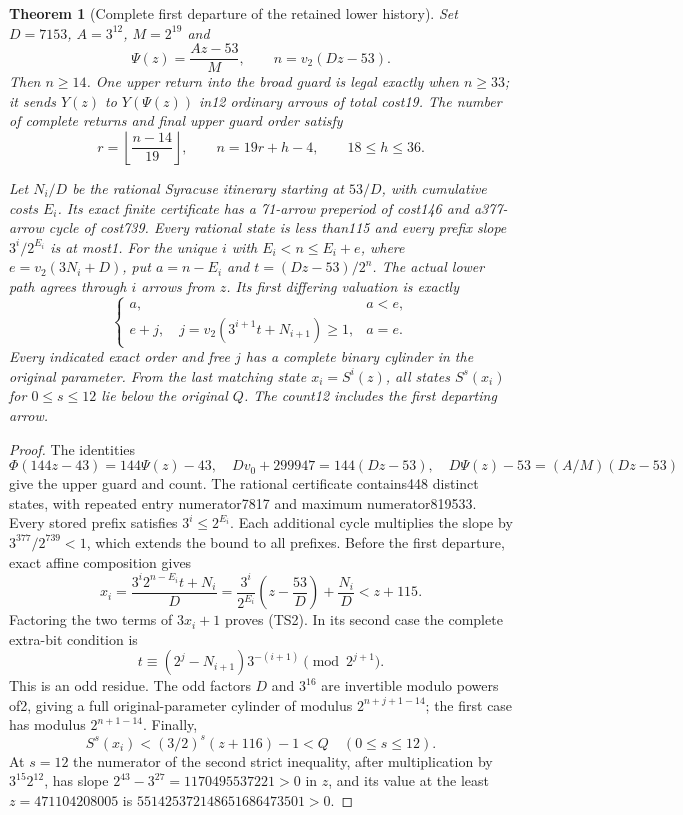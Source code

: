 \documentclass[11pt]{article}
\newtheorem{theorem}{Theorem}
\begin{document}
\begin{theorem}[Complete first departure of the retained lower history]
\label{thm:twosourcehistory}
Set $D=7153$, $A=3^{12}$, $M=2^{19}$ and
\[
 \Psi(z)=\frac{Az-53}{M},\qquad n=v_2(Dz-53).
\]
Then $n\ge14$. One upper return into the broad guard is legal exactly
when $n\ge33$; it sends $Y(z)$ to $Y(\Psi(z))$ in12 ordinary arrows
of total cost19. The number of complete returns and final upper
guard order satisfy
\[
 r=\left\lfloor\frac{n-14}{19}\right\rfloor,\qquad
 n=19r+h-4,\qquad18\le h\le36.
\]

Let $N_i/D$ be the rational Syracuse itinerary starting at $53/D$,
with cumulative costs $E_i$. Its exact finite certificate has a
71-arrow preperiod of cost146 and a377-arrow cycle of cost739.
Every rational state is less than115 and every prefix slope
$3^i/2^{E_i}$ is at most1.
For the unique $i$ with $E_i<n\le E_i+e$, where
$e=v_2(3N_i+D)$, put $a=n-E_i$ and $t=(Dz-53)/2^n$.
The actual lower path agrees through $i$ arrows from $z$. Its first
differing valuation is exactly
\[
 \begin{cases}
 a,&a<e,\\
 e+j,\quad j=v_2(3^{i+1}t+N_{i+1})\ge1,&a=e.
 \end{cases}
 \tag{TS2}
\]
Every indicated exact order and free $j$ has a complete binary cylinder
in the original parameter. From the last matching state $x_i=S^i(z)$,
all states $S^s(x_i)$ for $0\le s\le12$ lie below the original $Q$.
The count12 includes the first departing arrow.
\end{theorem}

\begin{proof}
The identities
\[
 \Phi(144z-43)=144\Psi(z)-43,\quad
 Dv_0+299947=144(Dz-53),\quad
 D\Psi(z)-53=(A/M)(Dz-53)
\]
give the upper guard and count. The rational certificate contains448
distinct states, with repeated entry numerator7817 and maximum
numerator819533. Every stored prefix satisfies $3^i\le2^{E_i}$.
Each additional cycle multiplies the slope by $3^{377}/2^{739}<1$,
which extends the bound to all prefixes.
Before the first departure, exact affine composition gives
\[
 x_i=\frac{3^i2^{n-E_i}t+N_i}{D}
     =\frac{3^i}{2^{E_i}}\left(z-\frac{53}{D}\right)+\frac{N_i}{D}
     <z+115.
\]
Factoring the two terms of $3x_i+1$ proves (TS2). In its second
case the complete extra-bit condition is
\[
 t\equiv(2^j-N_{i+1})3^{-(i+1)}\pmod{2^{j+1}}.
\]
This is an odd residue. The odd factors $D$ and $3^{16}$ are
invertible modulo powers of2, giving a full original-parameter
cylinder of modulus $2^{n+j+1-14}$; the first case has modulus
$2^{n+1-14}$.
Finally,
\[
 S^s(x_i)<(3/2)^s(z+116)-1<Q\quad(0\le s\le12).
\]
At $s=12$ the numerator of the second strict inequality, after
multiplication by $3^{15}2^{12}$, has slope
$2^{43}-3^{27}=1170495537221>0$ in $z$, and its value at the least
$z=471104208005$ is $551425372148651686473501>0$.
\end{proof}
\end{document}
